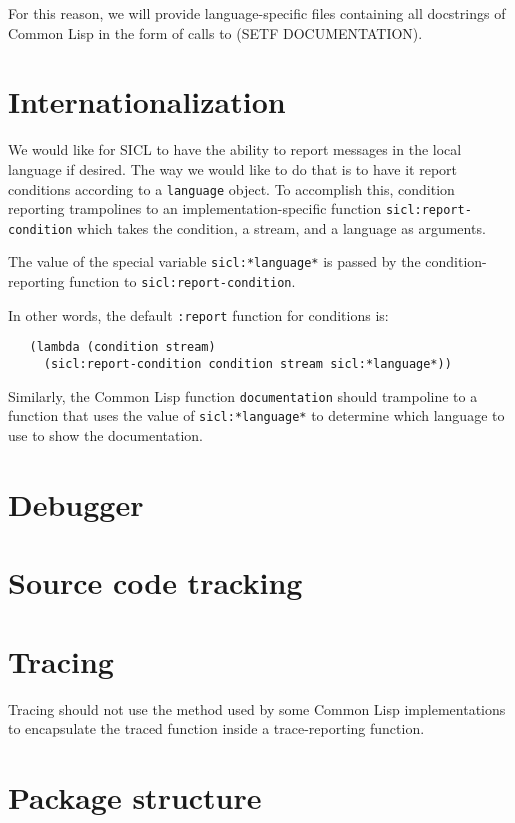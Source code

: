 \documentclass{article}
\def\sysname{SICL}
\begin{document}
For this reason, we will provide language-specific files containing
all docstrings of Common Lisp in the form of calls to (SETF
DOCUMENTATION). 

\section{Internationalization}

We would like for {\sysname} to have the ability to report messages in
the local language if desired.  The way we would like to do that is to
have it report conditions according to a \texttt{language} object.  To
accomplish this, condition reporting trampolines to an
implementation-specific function \texttt{sicl:report-condition} which
takes the condition, a stream, and a language as arguments.

The value of the special variable \texttt{sicl:*language*} is passed
by the condition-reporting function to \texttt{sicl:report-condition}.

In other words, the default \texttt{:report} function for conditions is:

\begin{verbatim}
   (lambda (condition stream) 
     (sicl:report-condition condition stream sicl:*language*))
\end{verbatim}

Similarly, the Common Lisp function \texttt{documentation} should
trampoline to a function that uses the value of
\texttt{sicl:*language*} to determine which language to use to show
the documentation. 

\section{Debugger}

\section{Source code tracking}

\section{Tracing}

Tracing should not use the method used by some Common Lisp
implementations to encapsulate the traced function inside a
trace-reporting function.

\section{Package structure}
\end{document}
